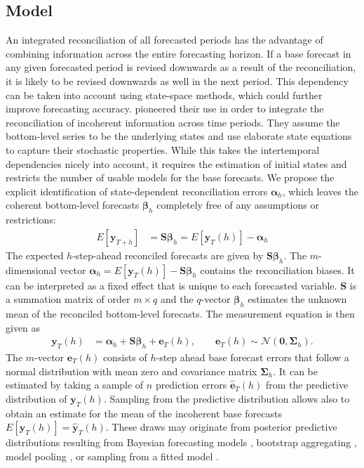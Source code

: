 \documentclass[a4paper,fleqn,11pt]{article}
\begin{document}
\subsection{Model}
An integrated reconciliation of all forecasted periods has the advantage of combining information across the entire forecasting horizon. If a base forecast in any given forecasted period is revised downwards as a result of the reconciliation, it is likely to be revised downwards as well in the next period. This dependency can be taken into account using state-space methods, which could further improve forecasting accuracy. \cite{Pennings2017} pioneered their use in order to integrate the reconciliation of incoherent information across time periods. They assume the bottom-level series to be the underlying states and use elaborate state equations to capture their stochastic properties. While this takes the intertemporal dependencies nicely into account, it requires the estimation of initial states and restricts the number of usable models for the base forecasts. We propose the explicit identification of state-dependent reconciliation errors $\boldsymbol{\alpha}_h$, which leaves the coherent bottom-level forecasts $\boldsymbol{\beta}_h$ completely free of any assumptions or restrictions:
\begin{align}
	\label{eq:main}
	E\left[\textbf{y}_{T+h}\right] & = \textbf{S} \boldsymbol{\beta}_h = E\left[\mathbf{y}_{T}(h)\right] - \boldsymbol{\alpha}_h
\end{align}
The expected $h$-step-ahead reconciled forecasts are given by $\textbf{S} \boldsymbol{\beta}_h$.  The $m$-dimensional vector $\boldsymbol{\alpha}_h = E\left[\mathbf{y}_{T}(h)\right] - \textbf{S} \boldsymbol{\beta}_h$ contains the reconciliation biases. It can be interpreted as a fixed effect that is unique to each forecasted variable. $\textbf{S}$ is a summation matrix of order $m \times q$ and the $q$-vector $\boldsymbol{\beta}_h$ estimates the unknown mean of the reconciled bottom-level forecasts. The measurement equation is then given as
\begin{align}
\label{eq:meas1}
\mathbf{y}_{T}(h) &  = \boldsymbol{\alpha}_h + \textbf{S} \boldsymbol{\beta}_h + \mathbf{e}_{T}(h), \qquad \mathbf{e}_{T}(h) \sim \mathcal{N}(\textbf{0}, \boldsymbol{\Sigma}_h).
\end{align}
The $m$-vector $\mathbf{e}_{T}(h)$ consists of $h$-step ahead base forecast errors that follow a normal distribution with mean zero and covariance matrix $\boldsymbol{\Sigma}_h$. It can be estimated by taking a sample of $n$ prediction errors $\mathbf{\hat{e}}_{T}(h)$ from the predictive distribution of $\mathbf{y}_{T}(h) $. Sampling from the predictive distribution allows also to obtain an estimate for the mean of the incoherent base forecasts $E\left[\mathbf{y}_{T}(h)\right] = \mathbf{\hat{y}}_{T}(h)$.  These draws may originate from posterior predictive distributions resulting from Bayesian forecasting models \citep{Cesur2016}, bootstrap aggregating \citep{Bergmeir2016}, model pooling \citep{Timmermann2006,Kapetanios2015}, or sampling from a fitted model \citep{Hyndman2018}. 
\end{document}
